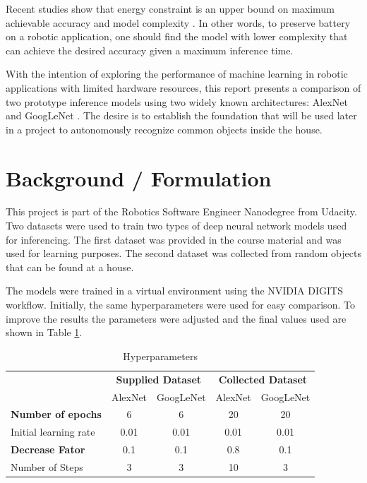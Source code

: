 \documentclass[10pt,journal,compsoc]{IEEEtran}
\begin{document}
Recent studies show that energy constraint is an upper bound on maximum achievable accuracy and model complexity \cite{Canziani2017AnAO}. In other words, to preserve battery on a robotic application, one should find the model with lower complexity that can achieve the desired accuracy given a maximum inference time. 

With the intention of exploring the performance of machine learning in robotic applications with limited hardware resources, this report presents a comparison of two prototype inference models using two widely known architectures: AlexNet \cite{NIPS2012_4824} and GoogLeNet \cite{GLN43022}. The desire is to establish the foundation that will be used later in a project to autonomously recognize common objects inside the house.

\section{Background / Formulation}

This project is part of the Robotics Software Engineer Nanodegree from Udacity. Two datasets were used to train two types of deep neural network models used for inferencing. The first dataset was provided in the course material and was used for learning purposes. The second dataset was collected from random objects that can be found at a house.

The models were trained in a virtual environment using the NVIDIA DIGITS workflow. Initially, the same hyperparameters were used for easy comparison. To improve the results the parameters were adjusted and the final values used are shown in Table \ref{tab:hyperparameters}.

\begin{table}[]
\centering
\begin{tabular}{l|c|c|c|c|}
\cline{2-5}
                                                & \multicolumn{2}{c|}{\textbf{Supplied Dataset}} & \multicolumn{2}{c|}{\textbf{Collected Dataset}} \\ \cline{2-5} 
                                                & AlexNet               & GoogLeNet              & AlexNet               & GoogLeNet               \\ \hline
\multicolumn{1}{|l|}{\textbf{Number of epochs}} & 6                     & 6                      & 20                    & 20                      \\ \hline
\multicolumn{1}{|l|}{Initial learning rate}     & 0.01                  & 0.01                   & 0.01                  & 0.01                    \\ \hline
\multicolumn{1}{|l|}{\textbf{Decrease Fator}}   & 0.1                   & 0.1                    & 0.8                   & 0.1                     \\ \hline
\multicolumn{1}{|l|}{Number of Steps}           & 3                     & 3                      & 10                    & 3                       \\ \hline
\end{tabular}
\caption{Hyperparameters}
\label{tab:hyperparameters}
\end{table}
\end{document}
